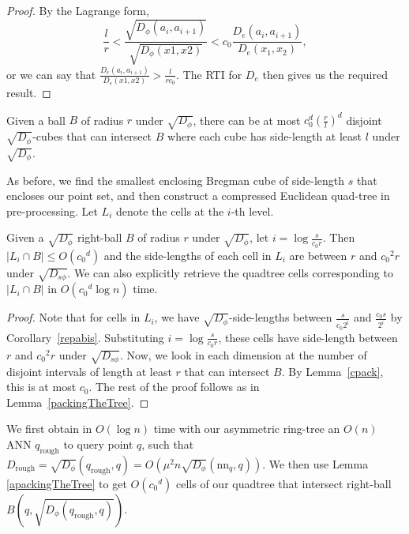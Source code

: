 \documentclass[11pt]{myclass}
\newcommand{\breg}{\ensuremath{D_\phi}}
\newcommand{\sbreg}{\ensuremath{D_{s\phi}}}
\begin{document}
\begin{proof}
By the Lagrange form, 
\begin{equation}
\frac{l}{r} < \frac{\sqrt{\breg(a_i, a_{i+1})}}{\sqrt{\breg(x1,x2)}} 
< c_0 \frac{D_e(a_i,a_{i+1})}{D_e(x_1,x_2)},
\end{equation}
or we can say that $\frac{D_e(a_i,a_{i+1})}{D_e(x1,x2)} > \frac{l}{r c_0}$.
The RTI for $D_e$ then gives us the required result.
\end{proof}

\begin{corollary}\label{cpackd}
 Given a ball $B$ of radius $r$ under $\sqrt{\breg}$, there can be at most
$c_0^d (\frac{r}{l})^d$ disjoint $\sqrt{\breg}$-cubes that can intersect $B$ where each cube has 
side-length at least $l$ under $\sqrt{\breg}$.
\end{corollary}


 As before, we  find the smallest enclosing Bregman cube of side-length $s$
that encloses our point set, and then construct a compressed Euclidean quad-tree in
pre-processing. Let $L_i$ denote the cells at the $i$-th level. 

 \begin{lemma}\label{apackingTheTree}
 Given a $\sqrt{\breg}$ right-ball $B$ of radius $r$ under $\sqrt{\breg}$, let $i = \log \frac{ s}{c_0 r}$. 
Then $|L_i \cap B| \leq O({c_0}^d)$ and the side-lengths of each cell in $L_i$ are
between $r$ and ${c_0}^2 r$ under $\sqrt{\sbreg}$. We can also explicitly retrieve 
the quadtree cells corresponding to $|L_i \cap B|$ in $O({c_0}^d \log n)$ time.
 \end{lemma}

 \begin{proof}
 Note that for cells in $L_i$, we have $\sqrt{\breg}$-side-lengths between 
$\frac{s}{c_0 2^i}$ and $\frac{c_0 s}{2^i}$ by Corollary~\ref{repabis}.
  Substituting $i = \log \frac{s}{c_0 r}$,  these cells have side-length 
between $r$ and ${c_0}^2 r$ under $\sqrt{\sbreg}$.
 Now, we look in each dimension at the number of disjoint intervals of length 
at least $r$ that can intersect $B$. By Lemma~\ref{cpack}, this is at most $c_0$.
 The rest of the proof follows as in Lemma~\ref{packingTheTree}. 
 \end{proof}

 We first obtain in $O(\log n)$ time with our asymmetric ring-tree an $O(n)$ 
ANN $q_{\text{rough}}$ to query point $q$, such that
$D_{\text{rough}} = \sqrt{\breg}( q_{\text{rough}},q) = O \left(\mu^2 n \sqrt{\breg} ( \text{nn}_q,q) \right)$.
 We then use Lemma \ref{apackingTheTree} to get $O({c_0}^d)$ cells of our quadtree that 
intersect right-ball $B \left(q, \sqrt{\breg ( q_{\text{rough}},q)} \right)$. 
\end{document}
